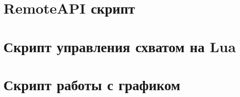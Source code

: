 \documentclass[14pt]{extarticle}
\begin{document}
    \appendix
    \renewcommand{\thesection}{\Asbuk{section}}
    \section{RemoteAPI скрипт}\label{code:remoteAPI}

    \section{Скрипт управления схватом на Lua}\label{code:gripper}

    \section{Скрипт работы с графиком}\label{code:graph}
\end{document}
